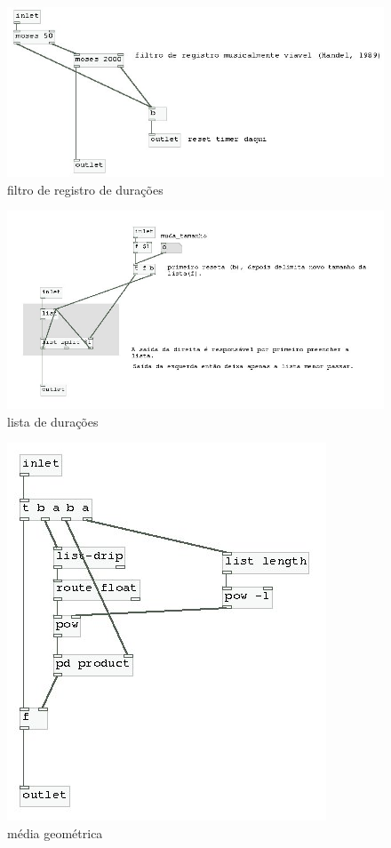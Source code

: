 \documentclass[draft]{ppgmus}
\begin{document}
\begin{figure}
\includegraphics[scale=.5]{sinc-calc-ritmo1}
\caption{filtro de registro de durações}
\label{[sinc-calc-ritmo1]}
\end{figure}

\begin{figure}
\includegraphics[scale=.5]{sinc-calc-ritmo2}
\caption{lista de durações}
\label{[sinc-calc-ritmo2]}
\end{figure}

\begin{figure}
\includegraphics[scale=.5]{sinc-calc-ritmo3}
\caption{média geométrica}
\label{[sinc-calc-ritmo3]}
\end{figure}
\end{document}
